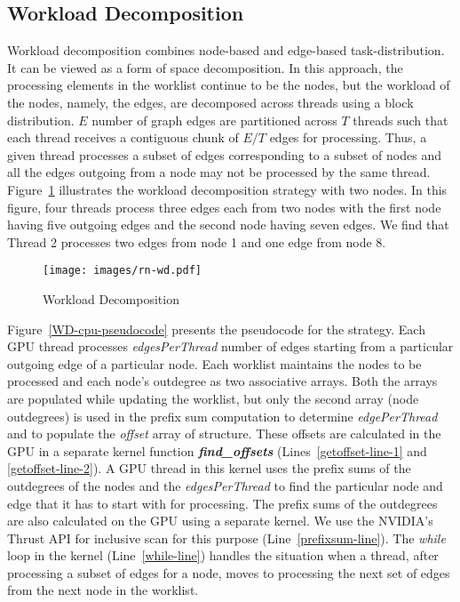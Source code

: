 \subsection{Workload Decomposition}\label{workload-decomposition}
Workload decomposition combines node-based and edge-based task-distribution.
It can be viewed as a form of space decomposition.
In this approach, the processing elements in the worklist continue to be the nodes, but the workload of the nodes, namely, the edges, are decomposed across threads using a block distribution.
$E$ number of graph edges are partitioned across $T$ threads such that each thread receives a contiguous chunk of $E/T$ edges for processing.
Thus, a given thread processes a subset of edges corresponding to a subset of nodes and all the edges outgoing from a node may not be processed by the same thread.
Figure~\ref{wd-illustration} illustrates the workload decomposition strategy with two nodes. 
In this figure, four threads process three edges each from two nodes with the first node having five outgoing edges and the second node having seven edges. 
We find that Thread 2 processes two edges from node 1 and one edge from node 8.

\begin{figure}
\centering
\texttt{[image: images/rn-wd.pdf]}
\caption{Workload Decomposition}
\label{wd-illustration}
\end{figure}

Figure~\ref{WD-cpu-pseudocode} presents the pseudocode for the strategy. 
Each GPU thread processes \textit{edgesPerThread} number of edges starting from a particular outgoing edge of a particular node. 
Each worklist maintains the nodes to be processed and each node's outdegree as two associative arrays.
Both the arrays are populated while updating the worklist, but only the second array (node outdegrees) is used in the prefix sum computation to determine \textit{edgePerThread} and to populate the \textit{offset} array of structure.
These offsets are calculated in the GPU in a separate kernel function \textbf{\textit{find\_offsets}} (Lines~\ref{getoffset-line-1} and \ref{getoffset-line-2}). 
A GPU thread in this kernel uses the prefix sums of the outdegrees of the nodes and the \textit{edgesPerThread} to find the particular node and edge that it has to start with for processing. 
The prefix sums of the outdegrees are also calculated on the GPU using a separate kernel. 
We use the NVIDIA's Thrust API for inclusive scan for this purpose (Line~\ref{prefixsum-line}). 
The \textit{while} loop in the kernel (Line~\ref{while-line}) handles the situation when a thread, after processing a subset of edges for a node, moves to processing the next set of edges from the next node in the worklist.

